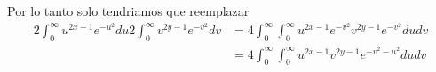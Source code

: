 \documentclass[12pt]{exam}
\begin{document}
Por lo tanto solo tendriamos que reemplazar
\begin{align*}
  2\int_0^\infty u^{2x - 1} e^{-u^2} du 2\int_0^\infty v^{2y - 1} e^{-v^2} dv &= 4 \int_0^\infty \int_0^\infty u^{2x - 1}e^{-v^2}v^{2y - 1} e^{-v^2} du dv\\
  &= 4 \int_0^\infty \int_0^\infty u^{2x - 1}v^{2y - 1} e^{-v^2 - u^2} du dv
\end{align*}
\end{document}
